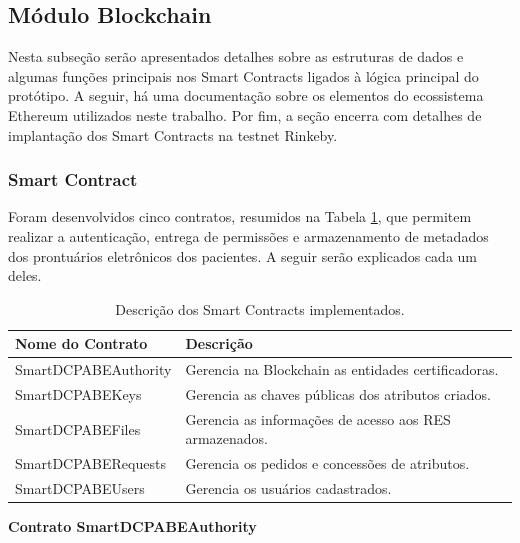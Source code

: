 \documentclass[a4paper,11pt]{article}
\begin{document}
\subsection{Módulo Blockchain}

Nesta subseção serão apresentados detalhes sobre as estruturas de dados e algumas funções principais nos Smart Contracts ligados à lógica principal do protótipo.
A seguir, há uma documentação sobre os elementos do ecossistema Ethereum utilizados neste trabalho. Por fim, a seção encerra com detalhes de implantação dos Smart Contracts na testnet Rinkeby.

\subsubsection{Smart Contract}
\label{sec:sub:ImplementacaoSmartContracts}

Foram desenvolvidos cinco contratos, resumidos na Tabela \ref{tbl:contratos}, que permitem realizar a autenticação, entrega de permissões e armazenamento de metadados dos prontuários eletrônicos dos pacientes.
A seguir serão explicados cada um deles.

\begin{table}[htb]
\centering
\begin{tabular}{|l|l|}
\hline
\textbf{Nome do Contrato} & \textbf{Descrição}  \\
\hline
SmartDCPABEAuthority &  Gerencia na Blockchain as entidades certificadoras.\\
\hline
SmartDCPABEKeys & Gerencia as chaves públicas dos atributos criados. \\
\hline
SmartDCPABEFiles & Gerencia as informações de acesso aos RES armazenados.\\
\hline
SmartDCPABERequests & Gerencia os pedidos e concessões de atributos. \\
\hline
SmartDCPABEUsers & Gerencia os usuários cadastrados.\\
\hline
\end{tabular}
\caption{Descrição dos Smart Contracts implementados.}
\label{tbl:contratos}
\end{table}

\textbf{Contrato SmartDCPABEAuthority}


\end{document}
